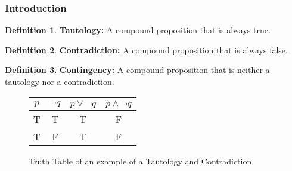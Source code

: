 \documentclass[article, 11pt]{article}
\theoremstyle{definition}
\newtheorem{definition}{Definition}[subsubsection]
\begin{document}
    \subsubsection{Introduction}
    \begin{definition}
        \textbf{Tautology:} A compound proposition that is always true.
    \end{definition}
    \begin{definition}
        \textbf{Contradiction:} A compound proposition that is always false.  
    \end{definition}
    \begin{definition}
        \textbf{Contingency:} A compound proposition that is neither a tautology nor a contradiction. 
    \end{definition}
    \begin{figure}[H]
        \centering
        \begin{tabular}{c|c|c|c}
            $p$ & $\neg q$ & $p \lor \neg q$ & $p \land \neg q$ \\
            \hline
            T & T & T & F \\
            T & F & T & F \\
        \end{tabular}
        \caption{Truth Table of an example of a Tautology and Contradiction}
    \end{figure}
\end{document}
